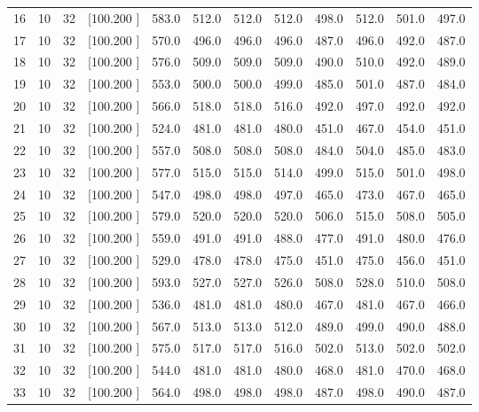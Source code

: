 \documentclass[12pt,a4paper]{article}
\begin{document}
\begin{center}
{\begin{tabular}{r r r r r r r r r r r r}
  16& 10& 32&[100.200   ]&   583.0&   512.0&   512.0&   512.0&   498.0&   512.0&   501.0&   497.0\\[-0.02in]
  17& 10& 32&[100.200   ]&   570.0&   496.0&   496.0&   496.0&   487.0&   496.0&   492.0&   487.0\\[-0.02in]
  18& 10& 32&[100.200   ]&   576.0&   509.0&   509.0&   509.0&   490.0&   510.0&   492.0&   489.0\\[-0.02in]
  19& 10& 32&[100.200   ]&   553.0&   500.0&   500.0&   499.0&   485.0&   501.0&   487.0&   484.0\\[-0.02in]
  20& 10& 32&[100.200   ]&   566.0&   518.0&   518.0&   516.0&   492.0&   497.0&   492.0&   492.0\\[-0.02in]
  21& 10& 32&[100.200   ]&   524.0&   481.0&   481.0&   480.0&   451.0&   467.0&   454.0&   451.0\\[-0.02in]
  22& 10& 32&[100.200   ]&   557.0&   508.0&   508.0&   508.0&   484.0&   504.0&   485.0&   483.0\\[-0.02in]
  23& 10& 32&[100.200   ]&   577.0&   515.0&   515.0&   514.0&   499.0&   515.0&   501.0&   498.0\\[-0.02in]
  24& 10& 32&[100.200   ]&   547.0&   498.0&   498.0&   497.0&   465.0&   473.0&   467.0&   465.0\\[-0.02in]
  25& 10& 32&[100.200   ]&   579.0&   520.0&   520.0&   520.0&   506.0&   515.0&   508.0&   505.0\\[-0.02in]
  26& 10& 32&[100.200   ]&   559.0&   491.0&   491.0&   488.0&   477.0&   491.0&   480.0&   476.0\\[-0.02in]
  27& 10& 32&[100.200   ]&   529.0&   478.0&   478.0&   475.0&   451.0&   475.0&   456.0&   451.0\\[-0.02in]
  28& 10& 32&[100.200   ]&   593.0&   527.0&   527.0&   526.0&   508.0&   528.0&   510.0&   508.0\\[-0.02in]
  29& 10& 32&[100.200   ]&   536.0&   481.0&   481.0&   480.0&   467.0&   481.0&   467.0&   466.0\\[-0.02in]
  30& 10& 32&[100.200   ]&   567.0&   513.0&   513.0&   512.0&   489.0&   499.0&   490.0&   488.0\\[-0.02in]
  31& 10& 32&[100.200   ]&   575.0&   517.0&   517.0&   516.0&   502.0&   513.0&   502.0&   502.0\\[-0.02in]
  32& 10& 32&[100.200   ]&   544.0&   481.0&   481.0&   480.0&   468.0&   481.0&   470.0&   468.0\\[-0.02in]
  33& 10& 32&[100.200   ]&   564.0&   498.0&   498.0&   498.0&   487.0&   498.0&   490.0&   487.0\\[-0.02in]

\end{tabular}}
\end{center}
\end{document}
